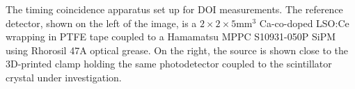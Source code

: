 \label{fig:actualsetup} The timing coincidence apparatus set up for DOI measurements. The reference detector, shown on the left of the image, is a $2\times2\times5$mm$^3$ Ca-co-doped LSO:Ce wrapping in PTFE tape coupled to a Hamamatsu MPPC S10931-050P SiPM using Rhorosil 47A optical grease. On the right, the source is shown close to the 3D-printed clamp holding the same photodetector coupled to the scintillator crystal under investigation.